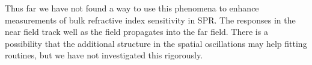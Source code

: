 Thus far we have not found a way to use this phenomena to enhance
measurements of bulk refractive index sensitivity in SPR\@.  The responses in
the near field track well as the field propagates into the far field.
There is a possibility that the additional structure in the spatial
oscillations may help fitting routines, but we have not investigated this
rigorously.
